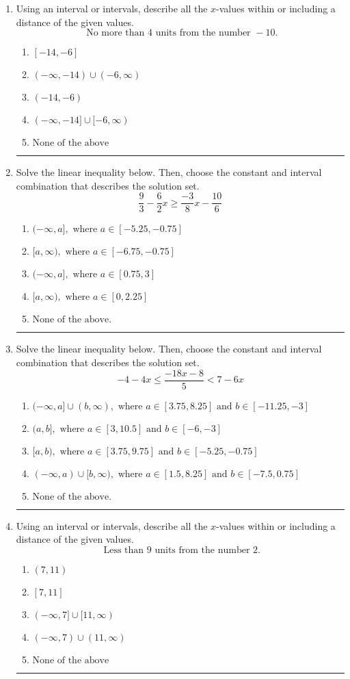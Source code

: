 \documentclass[14pt]{extbook}
\newcommand{\litem}[1]{\item#1\hspace*{-1cm}\rule{\textwidth}{0.4pt}}
\begin{document}
\begin{enumerate}
\litem{
Using an interval or intervals, describe all the $x$-values within or including a distance of the given values.\[ \text{ No more than } 4 \text{ units from the number } -10. \]\begin{enumerate}[label=\Alph*.]
\item \( [-14, -6] \)
\item \( (-\infty, -14) \cup (-6, \infty) \)
\item \( (-14, -6) \)
\item \( (-\infty, -14] \cup [-6, \infty) \)
\item \( \text{None of the above} \)

\end{enumerate} }
\litem{
Solve the linear inequality below. Then, choose the constant and interval combination that describes the solution set.\[ \frac{9}{3} - \frac{6}{2} x \geq \frac{-3}{8} x - \frac{10}{6} \]\begin{enumerate}[label=\Alph*.]
\item \( (-\infty, a], \text{ where } a \in [-5.25, -0.75] \)
\item \( [a, \infty), \text{ where } a \in [-6.75, -0.75] \)
\item \( (-\infty, a], \text{ where } a \in [0.75, 3] \)
\item \( [a, \infty), \text{ where } a \in [0, 2.25] \)
\item \( \text{None of the above}. \)

\end{enumerate} }
\litem{
Solve the linear inequality below. Then, choose the constant and interval combination that describes the solution set.\[ -4 - 4 x \leq \frac{-18 x - 8}{5} < 7 - 6 x \]\begin{enumerate}[label=\Alph*.]
\item \( (-\infty, a] \cup (b, \infty), \text{ where } a \in [3.75, 8.25] \text{ and } b \in [-11.25, -3] \)
\item \( (a, b], \text{ where } a \in [3, 10.5] \text{ and } b \in [-6, -3] \)
\item \( [a, b), \text{ where } a \in [3.75, 9.75] \text{ and } b \in [-5.25, -0.75] \)
\item \( (-\infty, a) \cup [b, \infty), \text{ where } a \in [1.5, 8.25] \text{ and } b \in [-7.5, 0.75] \)
\item \( \text{None of the above.} \)

\end{enumerate} }
\litem{
Using an interval or intervals, describe all the $x$-values within or including a distance of the given values.\[ \text{ Less than } 9 \text{ units from the number } 2. \]\begin{enumerate}[label=\Alph*.]
\item \( (7, 11) \)
\item \( [7, 11] \)
\item \( (-\infty, 7] \cup [11, \infty) \)
\item \( (-\infty, 7) \cup (11, \infty) \)
\item \( \text{None of the above} \)


\end{enumerate}}
\end{enumerate}
\end{document}
